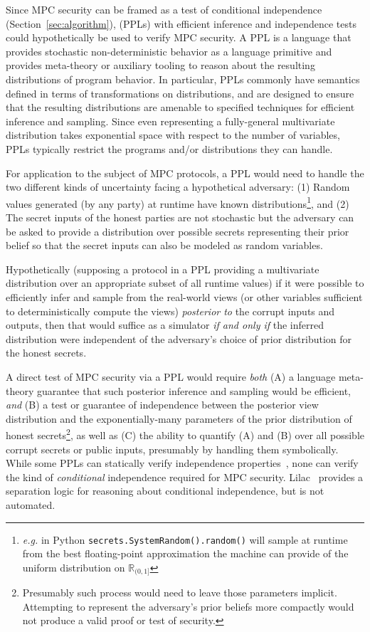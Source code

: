 \documentclass[acmlarge, manuscript, screen, review, anonymous, table]{acmart}
\newcommand{\eg}{\textit{e.g.}\xspace}
\begin{document}
Since MPC security can be framed as a test of conditional independence
(Section~\ref{sec:algorithm}),
 (PPLs) with efficient inference and independence tests could hypothetically be used to verify MPC security.
%
A PPL is a language that provides stochastic non-deterministic behavior as a language primitive
and provides meta-theory or auxiliary tooling to reason about the resulting distributions of program behavior.
In particular, PPLs commonly have semantics defined in terms of transformations on distributions,
and are designed to ensure that the resulting distributions are amenable to specified techniques for efficient
inference and sampling. Since even representing a fully-general multivariate distribution takes exponential space with respect to the number of variables,
PPLs typically restrict the programs and/or distributions they can handle.

For application to the subject of MPC protocols, a PPL would need to handle the two different kinds of uncertainty facing a hypothetical adversary:
(1) Random values generated (by any party) at runtime have known distributions\footnote{
    \eg in Python \texttt{secrets.SystemRandom().random()}
    will sample at runtime from the best floating-point approximation the machine can provide
    of the uniform distribution on $\mathbb{R}_{(0,1]}$
}, and
(2) The secret inputs of the honest parties are not stochastic but the adversary can be asked to provide a distribution over
possible secrets representing their prior belief so that the secret inputs can also be modeled as random variables.

Hypothetically (supposing a protocol in a PPL providing a multivariate distribution over an appropriate subset of all runtime values)
if it were possible to efficiently infer and sample from the real-world views
(or other variables sufficient to deterministically compute the views)
\emph{posterior to} the corrupt inputs and outputs,
then that would suffice as a simulator
\emph{if and only if} the inferred distribution were independent of the adversary's choice of prior distribution for the honest secrets.

A direct test of MPC security via a PPL would require \emph{both}
(A) a language meta-theory guarantee that such posterior inference and sampling would be efficient, \emph{and}
(B) a test or guarantee of independence between the posterior view distribution and the exponentially-many parameters
of the prior distribution of honest secrets\footnote{
    Presumably such process would need to leave those parameters implicit.
    Attempting to represent the adversary's prior beliefs more compactly would not produce a valid proof or test of security.
}, as well as
(C) the ability to quantify (A) and (B) over all possible corrupt secrets or public inputs, presumably by handling them symbolically.
While some PPLs can statically verify independence properties~\cite{gorinova2021conditional}, none can verify the kind of \emph{conditional} independence required for MPC security. Lilac~\cite{li2023lilac} provides a separation logic for reasoning about conditional independence, but is not automated.
\end{document}
